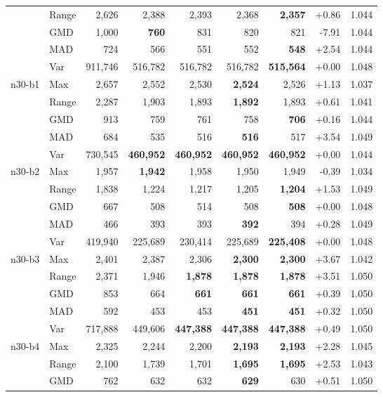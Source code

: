 \begin{small}
\begin{longtable}{llrrrrrrr}
 & Range & 2,626 & 2,388 & 2,393 & 2,368 & \textbf{2,357} & +0.86 & 1.044 \\
 & GMD & 1,000 & \textbf{760} & 831 & 820 & 821 & -7.91 & 1.044 \\
 & MAD & 724 & 566 & 551 & 552 & \textbf{548} & +2.54 & 1.044 \\
 & Var & 911,746 & 516,782 & 516,782 & 516,782 & \textbf{515,564} & +0.00 & 1.048 \\
n30-b1 & Max & 2,657 & 2,552 & 2,530 & \textbf{2,524} & 2,526 & +1.13 & 1.037 \\
 & Range & 2,287 & 1,903 & 1,893 & \textbf{1,892} & 1,893 & +0.61 & 1.041 \\
 & GMD & 913 & 759 & 761 & 758 & \textbf{706} & +0.16 & 1.044 \\
 & MAD & 684 & 535 & 516 & \textbf{516} & 517 & +3.54 & 1.049 \\
 & Var & 730,545 & \textbf{460,952} & \textbf{460,952} & \textbf{460,952} & \textbf{460,952} & +0.00 & 1.044 \\
n30-b2 & Max & 1,957 & \textbf{1,942} & 1,958 & 1,950 & 1,949 & -0.39 & 1.034 \\
 & Range & 1,838 & 1,224 & 1,217 & 1,205 & \textbf{1,204} & +1.53 & 1.049 \\
 & GMD & 667 & 508 & 514 & 508 & \textbf{508} & +0.00 & 1.048 \\
 & MAD & 466 & 393 & 393 & \textbf{392} & 394 & +0.28 & 1.049 \\
 & Var & 419,940 & 225,689 & 230,414 & 225,689 & \textbf{225,408} & +0.00 & 1.048 \\
n30-b3 & Max & 2,401 & 2,387 & 2,306 & \textbf{2,300} & \textbf{2,300} & +3.67 & 1.042 \\
 & Range & 2,371 & 1,946 & \textbf{1,878} & \textbf{1,878} & \textbf{1,878} & +3.51 & 1.050 \\
 & GMD & 853 & 664 & \textbf{661} & \textbf{661} & \textbf{661} & +0.39 & 1.050 \\
 & MAD & 592 & 453 & 453 & \textbf{451} & \textbf{451} & +0.32 & 1.050 \\
 & Var & 717,888 & 449,606 & \textbf{447,388} & \textbf{447,388} & \textbf{447,388} & +0.49 & 1.050 \\
n30-b4 & Max & 2,325 & 2,244 & 2,200 & \textbf{2,193} & \textbf{2,193} & +2.28 & 1.045 \\
 & Range & 2,100 & 1,739 & 1,701 & \textbf{1,695} & \textbf{1,695} & +2.53 & 1.043 \\
 & GMD & 762 & 632 & 632 & \textbf{629} & 630 & +0.51 & 1.050 \\

\end{longtable}
\end{small}
